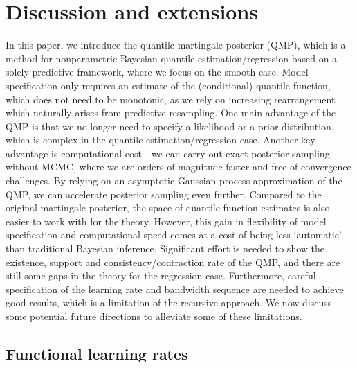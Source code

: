 \documentclass[11pt,a4paper]{article}
\begin{document}
\section{Discussion and extensions} \label{sec:discussion}
In this paper, we introduce the quantile martingale posterior (QMP), which is a method for nonparametric Bayesian quantile estimation/regression based on a solely predictive framework, where we focus on the smooth case. Model specification only requires an estimate of the (conditional) quantile function, which does not need to be monotonic, as we rely on increasing rearrangement which naturally arises from predictive resampling. One main advantage of the QMP is that we no longer need to specify a likelihood or a prior distribution, which is complex in the quantile estimation/regression case. Another key advantage is computational cost - we can carry out exact posterior sampling without MCMC, where we are orders of magnitude faster and free of convergence challenges. By relying on an asymptotic Gaussian process approximation of the QMP, we can accelerate posterior sampling even further. Compared to the original martingale posterior, the space of quantile function estimates is also easier to work with for the theory.
However, this gain in flexibility of model specification and computational speed comes at a cost of being less `automatic' than traditional Bayesian inference. Significant effort is needed to show the existence, support and consistency/contraction rate of the QMP, and there are still some gaps in the theory for the regression case. Furthermore, careful specification of the learning rate and bandwidth sequence are needed to achieve good results, which is a limitation of the recursive approach. We now discuss some potential future directions to alleviate some of these limitations.

\subsection{Functional learning rates}\label{sec:functional}
\end{document}
